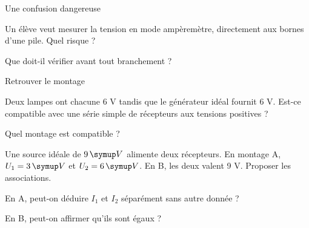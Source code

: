 \par\noindent\begin{minipage}{\linewidth}
\begin{exercice}[3]{Une confusion dangereuse}
\begin{questions}
\item Un élève veut mesurer la tension en mode ampèremètre, directement aux bornes d’une pile. Quel risque ?
\item Que doit-il vérifier avant tout branchement ?
\end{questions}
\end{exercice}
\end{minipage}
\par\noindent\begin{minipage}{\linewidth}
\begin{exercice}[3]{Retrouver le montage}
\begin{questions}
\item Deux lampes ont chacune 6 V tandis que le générateur idéal fournit 6 V. Est-ce compatible avec une série simple de récepteurs aux tensions positives ?
\item Quel montage est compatible ?
\end{questions}
\end{exercice}
\end{minipage}
\label{defi-ex-15}
\begin{questions}
\item Une source idéale de $9\unite V$ alimente deux récepteurs. En montage A, $U_1=3\unite V$ et $U_2=6\unite V$. En B, les deux valent 9 V. Proposer les associations.
\item En A, peut-on déduire $I_1$ et $I_2$ séparément sans autre donnée ?
\item En B, peut-on affirmer qu’ils sont égaux ?
\end{questions}
\pcGrille
